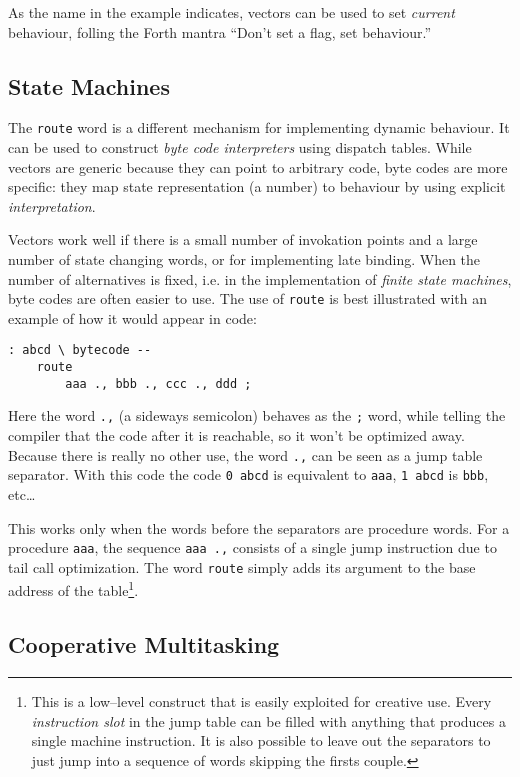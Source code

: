 \documentclass[12pt]{article}
\begin{document}
As the name in the example indicates, vectors can be used to set
\emph{current} behaviour, folling the Forth mantra ``Don't set a flag,
set behaviour.''

\subsection{State Machines}

The \verb|route| word is a different mechanism for implementing
dynamic behaviour. It can be used to construct \emph{byte code
  interpreters} using dispatch tables. While vectors are generic
because they can point to arbitrary code, byte codes are more
specific: they map state representation (a number) to behaviour by
using explicit \emph{interpretation}.

Vectors work well if there is a small number of invokation points and
a large number of state changing words, or for implementing late
binding.  When the number of alternatives is fixed, i.e. in the
implementation of \emph{finite state machines}, byte codes are often
easier to use. The use of \verb|route| is best illustrated with an
example of how it would appear in code:
\begin{verbatim}
: abcd \ bytecode --
    route
        aaa ., bbb ., ccc ., ddd ;
\end{verbatim}
Here the word \verb|.,| (a sideways semicolon) behaves as the \verb|;|
word, while telling the compiler that the code after it is reachable,
so it won't be optimized away. Because there is really no other use,
the word \verb|.,| can be seen as a jump table separator. With this
code the code \verb|0 abcd| is equivalent to \verb|aaa|, \verb|1 abcd|
is \verb|bbb|, etc\ldots

This works only when the words before the separators are procedure
words. For a procedure \verb|aaa|, the sequence \verb|aaa .,| consists
of a single jump instruction due to tail call optimization. The word
\verb|route| simply adds its argument to the base address of the
table\footnote{This is a low--level construct that is easily exploited
  for creative use. Every \emph{instruction slot} in the jump table
  can be filled with anything that produces a single machine
  instruction. It is also possible to leave out the separators to
  just jump into a sequence of words skipping the firsts couple.}.


\subsection{Cooperative Multitasking}
\end{document}
